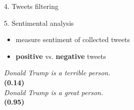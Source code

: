 \documentclass{beamer}
\begin{document}
\begin{frame}[fragile]
\begin{columns}[T]
\begin{column}{.33\textwidth}
\begin{blankblock}{4. Tweets filtering}
\begin{itemize}
\end{itemize}
\end{blankblock}
\begin{blankblock}{5. Sentimental analysis}
\begin{itemize}
    \item measure sentiment of collected tweets
    \item \textbf{positive} vs. \textbf{negative} tweets
\end{itemize}
\center
\textit{Donald Trump is a terrible person.}\\
\textbf{(0.14)}\\
\vspace{0.5cm}
\textit{Donald Trump is a great person.}\\
\textbf{(0.95)}
\end{blankblock}


\end{column}
\end{columns}
\end{frame}
\end{document}
